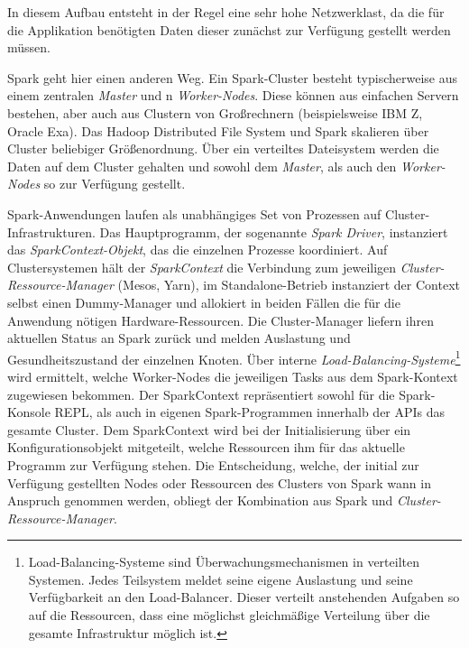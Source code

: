 In diesem Aufbau entsteht in der Regel eine sehr hohe Netzwerklast, da die für die Applikation benötigten Daten dieser zunächst zur Verfügung gestellt werden müssen. 

Spark geht hier einen anderen Weg. Ein Spark-Cluster besteht typischerweise aus einem zentralen \textit{Master} und n \textit{Worker-Nodes}. Diese können aus einfachen Servern bestehen, aber auch aus Clustern von Großrechnern (beispielsweise IBM Z, Oracle Exa). Das Hadoop Distributed File System und Spark skalieren über Cluster beliebiger Größenordnung. Über ein verteiltes Dateisystem werden die Daten auf dem Cluster gehalten und sowohl dem \textit{Master}, als auch den \textit{Worker-Nodes} so zur Verfügung gestellt. 




Spark-Anwendungen laufen als unabhängiges Set von Prozessen auf Cluster-Infrastrukturen. Das Hauptprogramm, der sogenannte \textit{Spark Driver}, instanziert das\textit{ SparkContext-Objekt}, das die einzelnen Prozesse koordiniert. Auf Clustersystemen hält der \textit{SparkContext} die Verbindung zum jeweiligen \textit{Cluster-Ressource-Manager} (Mesos, Yarn), im Standalone-Betrieb instanziert der Context selbst einen Dummy-Manager und allokiert in beiden Fällen die für die Anwendung nötigen Hardware-Ressourcen. Die Cluster-Manager liefern ihren aktuellen Status an Spark zurück und melden Auslastung und Gesundheitszustand der einzelnen Knoten. Über interne \textit{Load-Balancing-Systeme}\footnote{Load-Balancing-Systeme sind Überwachungsmechanismen in verteilten Systemen. Jedes Teilsystem meldet seine eigene Auslastung und seine Verfügbarkeit an den Load-Balancer. Dieser verteilt anstehenden Aufgaben so auf die Ressourcen, dass eine möglichst gleichmäßige Verteilung über die gesamte Infrastruktur möglich ist.} wird ermittelt, welche Worker-Nodes die jeweiligen Tasks aus dem Spark-Kontext zugewiesen bekommen. Der SparkContext repräsentiert sowohl für die Spark-Konsole REPL, als auch in eigenen Spark-Programmen innerhalb der APIs das gesamte Cluster. Dem SparkContext wird bei der Initialisierung über ein Konfigurationsobjekt mitgeteilt, welche Ressourcen ihm für das aktuelle Programm zur Verfügung stehen. Die Entscheidung, welche, der initial zur Verfügung gestellten Nodes oder Ressourcen des Clusters von Spark wann in Anspruch genommen werden, obliegt der Kombination aus Spark und \textit{Cluster-Ressource-Manager}. 


